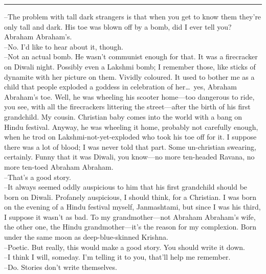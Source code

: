 \documentclass[12pt]{memoir}
\begin{document}
\hrule 
\vspace{\baselineskip}
--The problem with tall dark strangers is that when you get to know them they're only tall and dark. His toe was blown off by a bomb, did I ever tell you? Abraham Abraham's.\\
--No. I'd like to hear about it, though.\\
--Not an actual bomb. He wasn't communist enough for that. It was a firecracker on Diwali night. Possibly even a Lakshmi bomb; I remember those, like sticks of dynamite with her picture on them. Vividly coloured. It used to bother me as a child that people exploded a goddess in celebration of her\ldots \ yes, Abraham Abraham's toe. Well, he was wheeling his scooter home---too dangerous to ride, you see, with all the firecrackers littering the street---after the birth of his first grandchild. My cousin. Christian baby comes into the world with a bang on Hindu festival. Anyway, he was wheeling it home, probably not carefully enough, when he trod on Lakshmi-not-yet-exploded who took his toe off for it. I suppose there was a lot of blood; I was never told that part. Some un-christian swearing, certainly. Funny that it was Diwali, you know---no more ten-headed Ravana, no more ten-toed Abraham Abraham.\\
--That's a good story.\\
--It always seemed oddly auspicious to him that his first grandchild should be born on Diwali. Profanely auspicious, I should think, for a Christian. I was born on the evening of a Hindu festival myself, Janmashtami, but since I was his third, I suppose it wasn't as bad. To my grandmother---not Abraham Abraham's wife, the other one, the Hindu grandmother---it's the reason for my complexion. Born under the same moon as deep-blue-skinned Krishna.\\
--Poetic. But really, this would make a good story. You should write it down.\\
--I think I will, someday. I'm telling it to you, that'll help me remember.\\
--Do. Stories don't write themselves.\\
\end{document}
